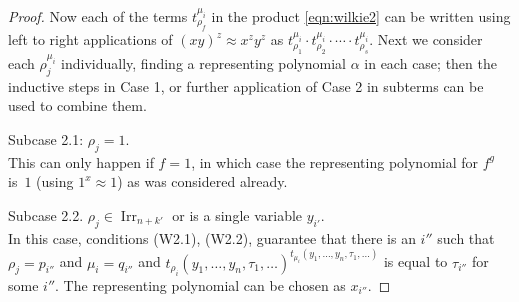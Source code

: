 \documentclass[eqnor,reqno]{amsart}
\theoremstyle{plain}
\theoremstyle{definition}
\newcommand{\Irr}{\operatorname{Irr}}
\begin{document}
\begin{proof}
Now each of the terms $t_{\rho_f}^{\mu_i}$ in the product \eqref{eqn:wilkie2} can be written using left to right applications of $(xy)^z\approx x^zy^z$ as $t_{\rho_1}^{\mu_i}\cdot t_{\rho_2}^{\mu_i}\cdot \cdots\cdot t_{\rho_s}^{\mu_i}$.  
Next we consider each $\rho_j^{\mu_i}$ individually, finding a representing polynomial $\alpha$ in each case; then the inductive steps in Case 1, or further application of Case 2 in subterms can be used to combine them.  

Subcase 2.1: $\rho_j=1$.\\
This can only happen if $f=1$, in which case the representing polynomial for $f^g$ is~$1$ (using $1^x\approx 1$) as was considered already.  

Subcase 2.2.  $\rho_j\in \Irr_{n+k'}$ or is a single variable $y_{i'}$.\\
In this case, conditions (W2.1), (W2.2), guarantee that there is an $i''$ such that $\rho_j=p_{i''}$ and $\mu_i=q_{i''}$ and $t_{\rho_i}(y_1,\dots,y_n,\tau_1,\dots)^{t_{\mu_i}(y_1,\dots,y_n,\tau_1,\dots)}$ is equal to $\tau_{i''}$ for some $i''$.  The representing polynomial can be chosen as $x_{i''}$.  


\end{proof}
\end{document}
